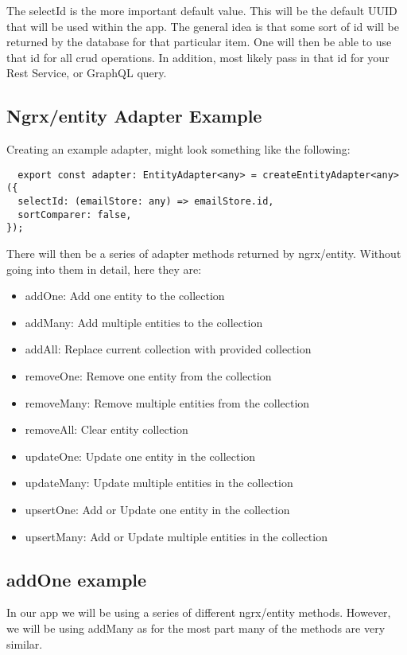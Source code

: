 The selectId is the more important default value. This will be the default UUID
that will be used within the app. The general idea is that some sort of id will
be returned by the database for that particular item. One will then be able to
use that id for all crud operations. In addition, most likely pass in that id
for your Rest Service, or GraphQL query.

\subsection{ Ngrx/entity Adapter Example }
Creating an example adapter, might look something like the following:
\begin{lstlisting}
  export const adapter: EntityAdapter<any> = createEntityAdapter<any>({
  selectId: (emailStore: any) => emailStore.id,
  sortComparer: false,
});
\end{lstlisting}

There will then be a series of adapter methods returned by ngrx/entity. Without
going into them in detail, here they are:
\begin{itemize}
  \item addOne: Add one entity to the collection
  \item addMany: Add multiple entities to the collection
  \item addAll: Replace current collection with provided collection
  \item removeOne: Remove one entity from the collection
  \item removeMany: Remove multiple entities from the collection
  \item removeAll: Clear entity collection
  \item updateOne: Update one entity in the collection
  \item updateMany: Update multiple entities in the collection
  \item upsertOne: Add or Update one entity in the collection
  \item upsertMany: Add or Update multiple entities in the collection
\end{itemize}

\subsection{ addOne example }
In our app we will be using a series of different ngrx/entity methods. However,
we will be using addMany as for the most part many of the methods are very
similar.

